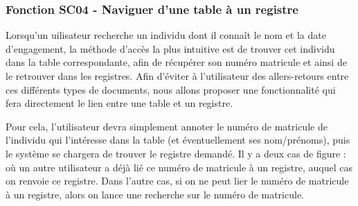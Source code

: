 \documentclass[a4paper]{article}
\begin{document}
\subsubsection{Fonction SC04 - Naviguer d'une table à un registre}

Lorsqu'un uilisateur recherche un individu dont il connaît le nom et la date d'engagement, la méthode d'accès la plus intuitive est de trouver cet individu dans la table correspondante, afin de récupérer son numéro matricule et ainsi de le retrouver dans les registres. Afin d'éviter à l'utilisateur des allers-retours entre ces différents types de documents, nous allons proposer une fonctionnalité qui fera directement le lien entre une table et un registre.

Pour cela, l'utilisateur devra simplement annoter le numéro de matricule de l'individu qui l'intéresse dans la table (et éventuellement ses nom/prénoms), puis le système se chargera de trouver le registre demandé. Il y a deux cas de figure : où un autre utilisateur a déjà lié ce numéro de matricule à un registre, auquel cas on renvoie ce registre. Dans l'autre cas, si on ne peut lier le numéro de matricule à un registre, alors on lance une recherche sur le numéro de matricule. 
\end{document}
